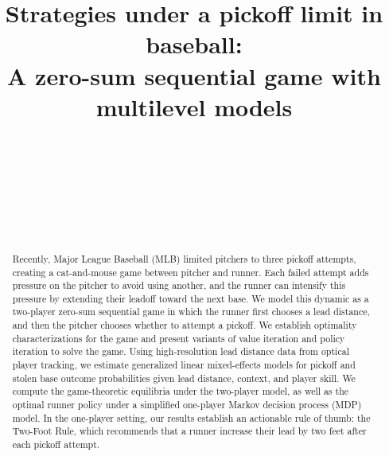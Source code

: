 \documentclass[aoas]{imsart}
\begin{document}
\begin{frontmatter}
\title{
  Strategies under a pickoff limit in baseball:\\A zero-sum sequential game with multilevel models
}

\begin{aug}
\author[A]{~}
\author[B]{~}
\author[A]{~}
\author[B]{~}
\address[A]{Department of Sport Management, Rice University}
\address[B]{Department of Computational Applied Mathematics and Operations Research, Rice University}
\end{aug}

\begin{abstract}
  Recently, Major League Baseball (MLB) limited pitchers to three pickoff attempts, creating a cat-and-mouse game between pitcher and runner. Each failed attempt adds pressure on the pitcher to avoid using another, and the runner can intensify this pressure by extending their leadoff toward the next base. We model this dynamic as a two-player zero-sum sequential game in which the runner first chooses a lead distance, and then the pitcher chooses whether to attempt a pickoff. We establish optimality characterizations for the game and present variants of value iteration and policy iteration to solve the game. Using high-resolution lead distance data from optical player tracking, we estimate generalized linear mixed-effects models for pickoff and stolen base outcome probabilities given lead distance, context, and player skill. We compute the game-theoretic equilibria under the two-player model, as well as the optimal runner policy under a simplified one-player Markov decision process (MDP) model. In the one-player setting, our results establish an actionable rule of thumb: the Two-Foot Rule, which recommends that a runner increase their lead by two feet after each pickoff attempt.
\end{abstract}


\end{frontmatter}
\end{document}
